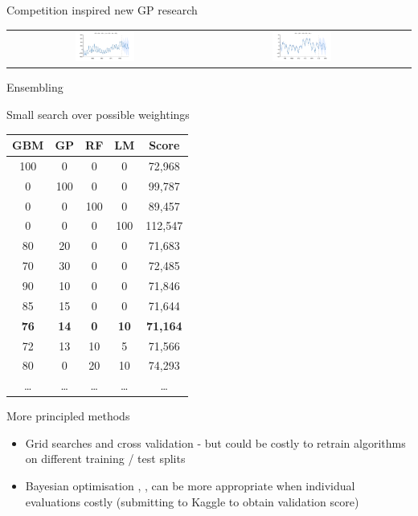 \begin{frame}{Competition inspired new GP research}
\begin{tabular}{ccc}
\includegraphics[width=0.32\textwidth]{figures/monthly-canadian-total-unemploym/monthly-canadian-total-unemploym_all} & 
\includegraphics[width=0.32\textwidth]{figures/monthly-sales-of-us-houses-thous/monthly-sales-of-us-houses-thous_all}
  \end{tabular}
\end{frame}

\begin{frame}{Ensembling}
  \begin{block}{Small search over possible weightings}
    \begin{center}
      \scriptsize
      \begin{tabular}{cccc|c}
        GBM & GP & RF & LM & Score \\
        \hline
        100 & 0 & 0 & 0 & 72,968 \\
        0 & 100 & 0 & 0 & 99,787 \\
        0 & 0 & 100 & 0 & 89,457 \\
        0 & 0 & 0 & 100 & 112,547 \\
        80 & 20 & 0 & 0 & 71,683 \\
        70 & 30 & 0 & 0 & 72,485 \\
        90 & 10 & 0 & 0 & 71,846 \\
        85 & 15 & 0 & 0 & 71,644 \\
        \bf{76} & \bf{14} & \bf{0} & \bf{10} & \bf{71,164} \\
        72 & 13 & 10 & 5 & 71,566 \\
        80 & 0 & 20 & 10 & 74,293 \\
        \ldots & \ldots & \ldots & \ldots & \ldots
      \end{tabular}
      \vspace{-1\baselineskip}
    \end{center}
      \vspace{-1\baselineskip}
  \end{block}
  \begin{block}{More principled methods}
    \begin{itemize}
      \item Grid searches and cross validation - but could be costly to retrain algorithms on different training / test splits
      \item Bayesian optimisation \cite{Osborne2009}, \cite{snoek2012practical}, \cite{HennigSchuler2012} can be more appropriate when individual evaluations costly (\eg submitting to Kaggle to obtain validation score)
    \end{itemize}
  \end{block}
\end{frame}

